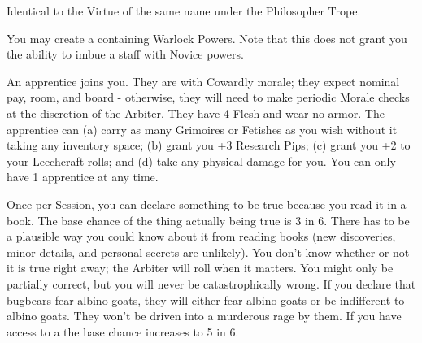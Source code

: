\begin{multicols*}{2}
Identical to the Virtue of the same name under the Philosopher Trope.


You may create a  containing Warlock Powers. Note that this does not grant you the ability to imbue a staff with Novice powers.


An apprentice joins you.  They are  with Cowardly morale; they expect nominal pay, room, and board - otherwise, they will need to make periodic Morale checks at the discretion of the Arbiter.  They have 4 Flesh and wear no armor. The apprentice can (a) carry as many Grimoires or Fetishes as you wish without it taking any inventory space; (b) grant you +3 Research Pips; (c) grant you +2 to your Leechcraft rolls; and (d) take any physical damage for you.  You can only have 1 apprentice at any time.

\newpage


Once per Session, you can declare something to be true because you read it in a book. The base chance of the thing actually being true is 3 in 6. There has to be a plausible way you could know about it from reading books (new discoveries, minor details, and personal secrets are unlikely). You don't know whether or not it is true right away; the Arbiter will roll when it matters. You might only be partially correct, but you will never be catastrophically wrong. If you declare that bugbears fear albino goats, they will either fear albino goats or be indifferent to albino goats. They won't be driven into a murderous rage by them. If you have access to a  the base chance increases to 5 in 6.

\cbreak




\end{multicols*}

